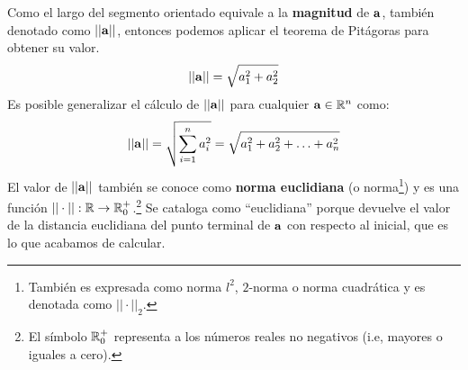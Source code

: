 \documentclass[12pt]{article}
\begin{document}
\begin{figure}[hbt!]
\centering


\end{figure}

Como el largo del segmento orientado equivale a la \textbf{magnitud} de $\mathbf{a}$, también denotado como $||\mathbf{a}||$, entonces podemos aplicar el teorema de Pitágoras para obtener su valor.
\[
  ||\mathbf{a}|| = \sqrt{a_{1}^{2} + a_{2}^{2}}
\]
Es posible generalizar el cálculo de $||\mathbf{a}||$ para cualquier $\mathbf{a} \in \mathbb{R}^{n}$ como:
\[
  ||\mathbf{a}|| = \sqrt{\sum_{i = 1}^{n} a_{i}^{2}} = \sqrt{a_{1}^{2} + a_{2}^{2} + \ldots + a_{n}^{2}}
\]
El valor de $||\mathbf{a}||$ también se conoce como \textbf{norma euclidiana} (o norma\footnote{También es expresada como norma $l^{2}$, $2$-norma o norma cuadrática y es denotada como $|| \cdot ||_{2}$.}) y es una función $|| \cdot ||: \mathbb{R} \to \mathbb{R}_{0}^{+}$.\footnote{El símbolo $\mathbb{R}_{0}^{+}$ representa a los números reales no negativos (i.e, mayores o iguales a cero).} Se cataloga como ``euclidiana'' porque devuelve el valor de la distancia euclidiana del punto terminal de $\mathbf{a}$ con respecto al inicial, que es lo que acabamos de calcular.
\end{document}
